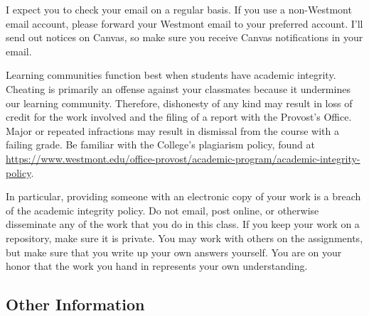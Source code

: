 \documentclass[
  twoside]{article}
\begin{document}
I expect you to check your email on a regular basis. If you use a
non-Westmont email account, please forward your Westmont email to your
preferred account. I'll send out notices on Canvas, so make sure you
receive Canvas notifications in your email.

Learning communities function best when students have academic
integrity. Cheating is primarily an offense against your classmates
because it undermines our learning community. Therefore, dishonesty of
any kind may result in loss of credit for the work involved and the
filing of a report with the Provost's Office. Major or repeated
infractions may result in dismissal from the course with a failing
grade. Be familiar with the College's plagiarism policy, found at
\url{https://www.westmont.edu/office-provost/academic-program/academic-integrity-policy}.

In particular, providing someone with an electronic copy of your work is
a breach of the academic integrity policy. Do not email, post online, or
otherwise disseminate any of the work that you do in this class. If you
keep your work on a repository, make sure it is private. You may work
with others on the assignments, but make sure that you write up your own
answers yourself. You are on your honor that the work you hand in
represents your own understanding.

\hypertarget{other-information}{%
\subsection{Other Information}\label{other-information}}
\end{document}
